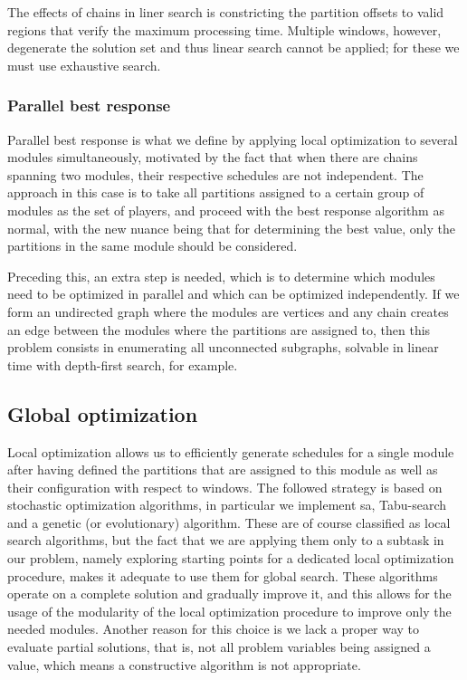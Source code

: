 \documentclass[main.tex]{subfiles}
\begin{document}
The effects of chains in liner search is constricting the partition offsets to valid regions that verify the maximum processing time.
Multiple windows, however, degenerate the solution set and thus linear search cannot be applied; for these we must use exhaustive search.

\subsubsection{Parallel best response}
\label{sec:parallel}

Parallel best response is what we define by applying local optimization to several modules simultaneously, motivated by the fact that when there are chains spanning two modules, their respective schedules are not independent.
The approach in this case is to take all partitions assigned to a certain group of modules as the set of players, and proceed with the best response algorithm as normal, with the new nuance being that for determining the best value, only the partitions in the same module should be considered.

Preceding this, an extra step is needed, which is to determine which modules need to be optimized in parallel and which can be optimized independently.
If we form an undirected graph where the modules are vertices and any chain creates an edge between the modules where the partitions are assigned to, then this problem consists in enumerating all unconnected subgraphs, solvable in linear time with depth-first search, for example.

\subsection{Global optimization}
\label{sec:global}

Local optimization allows us to efficiently generate schedules for a single module after having defined the partitions that are assigned to this module as well as their configuration with respect to windows.
The followed strategy is based on stochastic optimization algorithms, in particular we implement \gls{sa}, Tabu-search and a genetic (or evolutionary) algorithm.
These are of course classified as local search algorithms, but the fact that we are applying them only to a subtask in our problem, namely exploring starting points for a dedicated local optimization procedure, makes it adequate to use them for global search.
These algorithms operate on a complete solution and gradually improve it, and this allows for the usage of the modularity of the local optimization procedure to improve only the needed modules.
Another reason for this choice is we lack a proper way to evaluate partial solutions, that is, not all problem variables being assigned a value, which means a constructive algorithm is not appropriate.
\end{document}
